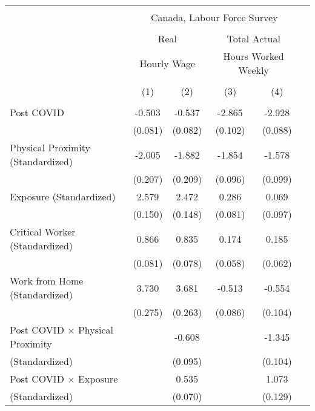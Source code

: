 \begin{tabular*}{\textwidth}{ @{\extracolsep{\fill}}l*{5}{c}}
\hline\hline
\\
 &\multicolumn{4}{c}{Canada, Labour Force Survey} \\
\cline{2-5} \\
&\multicolumn{2}{c}{Real} &\multicolumn{2}{c}{Total Actual} \\
&\multicolumn{2}{c}{Hourly Wage} &\multicolumn{2}{c}{Hours Worked Weekly} \\
\cline{2-3} \cline{4-5} \\
                                             &\multicolumn{1}{c}{(1)}     &\multicolumn{1}{c}{(2)}     &\multicolumn{1}{c}{(3)}     &\multicolumn{1}{c}{(4)}\\
\hline
\\
Post COVID                                   &-0.503     &-0.537     &-2.865     &-2.928\\
                                             &(0.081)     &(0.082)     &(0.102)     &(0.088)\\[0.5em]
%
Physical Proximity (Standardized)            &-2.005     &-1.882     &-1.854     &-1.578\\
                                             &(0.207)     &(0.209)     &(0.096)     &(0.099)\\[0.5em]
%
Exposure (Standardized)                      &2.579     &2.472     &0.286     &0.069\\
                                             &(0.150)     &(0.148)     &(0.081)     &(0.097)\\[0.5em]
%
Critical Worker (Standardized)               &0.866     &0.835     &0.174     &0.185\\
                                             &(0.081)     &(0.078)     &(0.058)     &(0.062)\\[0.5em]
%
Work from Home (Standardized)                &3.730     &3.681     &-0.513     &-0.554\\
                                             &(0.275)     &(0.263)     &(0.086)     &(0.104)\\[0.5em]
%
Post COVID $\times$ Physical Proximity       &         &-0.608     &         &-1.345\\
(Standardized)                               &         &(0.095)     &         &(0.104)\\[0.5em]
%
Post COVID $\times$ Exposure                 &         &0.535     &         &1.073\\
(Standardized)                               &         &(0.070)     &         &(0.129)\\[0.5em]

\end{tabular*}
